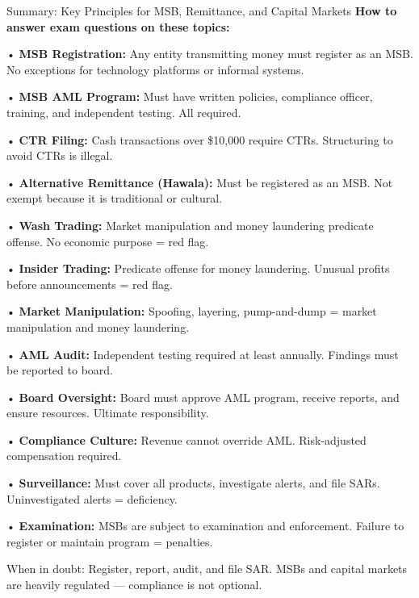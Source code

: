\documentclass[11pt,a4paper]{beamer}
\begin{document}
\begin{frame}{Summary: Key Principles for MSB, Remittance, and Capital Markets}
\tiny
\noindent\textbf{How to answer exam questions on these topics:}

\vspace{0.1cm}
\noindent• \textbf{MSB Registration:} Any entity transmitting money must register as an MSB. No exceptions for technology platforms or informal systems.

\vspace{0.1cm}
\noindent• \textbf{MSB AML Program:} Must have written policies, compliance officer, training, and independent testing. All required.

\vspace{0.1cm}
\noindent• \textbf{CTR Filing:} Cash transactions over \$10,000 require CTRs. Structuring to avoid CTRs is illegal.

\vspace{0.1cm}
\noindent• \textbf{Alternative Remittance (Hawala):} Must be registered as an MSB. Not exempt because it is traditional or cultural.

\vspace{0.1cm}
\noindent• \textbf{Wash Trading:} Market manipulation and money laundering predicate offense. No economic purpose = red flag.

\vspace{0.1cm}
\noindent• \textbf{Insider Trading:} Predicate offense for money laundering. Unusual profits before announcements = red flag.

\vspace{0.1cm}
\noindent• \textbf{Market Manipulation:} Spoofing, layering, pump-and-dump = market manipulation and money laundering.

\vspace{0.1cm}
\noindent• \textbf{AML Audit:} Independent testing required at least annually. Findings must be reported to board.

\vspace{0.1cm}
\noindent• \textbf{Board Oversight:} Board must approve AML program, receive reports, and ensure resources. Ultimate responsibility.

\vspace{0.1cm}
\noindent• \textbf{Compliance Culture:} Revenue cannot override AML. Risk-adjusted compensation required.

\vspace{0.1cm}
\noindent• \textbf{Surveillance:} Must cover all products, investigate alerts, and file SARs. Uninvestigated alerts = deficiency.

\vspace{0.1cm}
\noindent• \textbf{Examination:} MSBs are subject to examination and enforcement. Failure to register or maintain program = penalties.

\vspace{0.3cm}
\centering
{When in doubt: Register, report, audit, and file SAR. MSBs and capital markets are heavily regulated — compliance is not optional.}
\end{frame}
\end{document}
